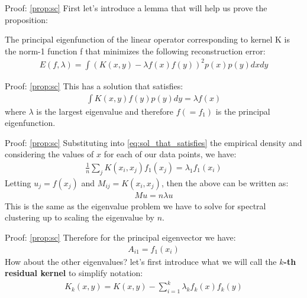 \documentclass[aspectratio=169]{beamer}
\begin{document}
\begin{frame}{Proof: \cref{prop:sc}}
  First let's introduce a lemma that will help us prove the proposition:
  \begin{lemma} \label{lemma:prop1}
    The principal eigenfunction of the linear operator corresponding to kernel K is the norm-1 function f that minimizes the following reconstruction error:
    \begin{align*}
      E(f, \lambda) = \int (K(x,y) - \lambda f(x) f(y))^{2} p(x) p(y) dx dy
    \end{align*}
  \end{lemma}
\end{frame}

\begin{frame}{Proof: \cref{prop:sc}}
  This has a solution that satisfies:
  \begin{align} \label{eq:sol_that_satisfies}
    \int K(x,y) f(y) p(y) dy = \lambda f(x)
  \end{align}
  where $\lambda$ is the largest eigenvalue and therefore $f (=f_{1})$ is the principal eigenfunction.
\end{frame}

\begin{frame}{Proof: \cref{prop:sc}}
  Substituting into \cref{eq:sol_that_satisfies} the empirical density and considering the values of $x$ for each of our data points, we have:
  \begin{align*}
    \frac{1}{n} \sum_{j} K(x_{i},x_{j}) f_{1}(x_{j}) = \lambda_{1} f_{1}(x_{i})
  \end{align*}
  Letting $u_{j}=f(x_{j})$ and $M_{ij} = K(x_{i},x_{j})$, then the above can be written as:
  \begin{align*}
    M u = n \lambda u 
  \end{align*}
  This is the same as the eigenvalue problem we have to solve for spectral clustering up to scaling the eigenvalue by $n$. 
\end{frame}

\begin{frame}{Proof: \cref{prop:sc}}
  Therefore for the principal eigenvector we have:
  \begin{align*}
    A_{i1} = f_{1} (x_{i})
  \end{align*}
  How about the other eigenvalues? let's first introduce what we will call the \textbf{$k$-th residual kernel} to simplify notation:
  \begin{align}
    K_{k}(x,y) = K(x,y) - \sum_{i=1}^{k} \lambda_{k} f_{k} (x) f_{k} (y) 
  \end{align}

\end{frame}
\end{document}
